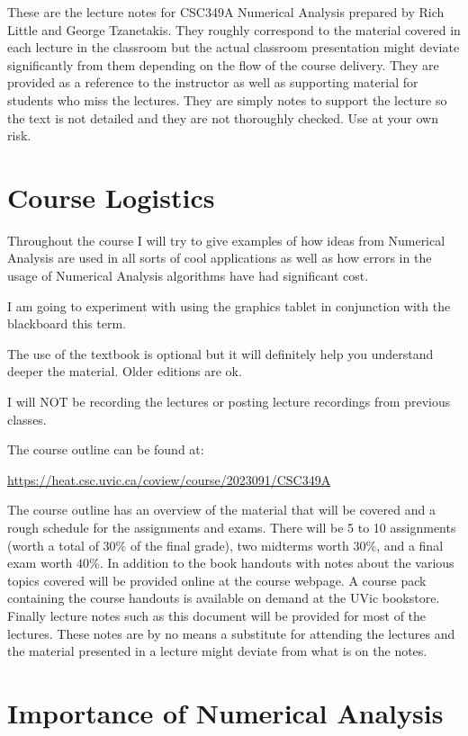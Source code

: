 \documentclass [titlepage,12pt,letter] {article}
\begin{document}
 


These are the lecture notes for CSC349A Numerical Analysis prepared by
Rich Little and George Tzanetakis. They roughly correspond to
the material covered in each lecture in the classroom but the actual
classroom presentation might deviate significantly from them depending
on the flow of the course delivery. They are provided as a reference to
the instructor as well as supporting material for students who miss
the lectures. They are simply notes to support the lecture so the text
is not detailed and they are not thoroughly checked. Use at your own
risk.

\section{Course Logistics} 

Throughout the course I will try to give examples of how
ideas from Numerical Analysis are used in all sorts of cool
applications as well as how errors in the usage of Numerical Analysis
algorithms have had significant cost. 

I am going to experiment with using the graphics tablet in conjunction with the blackboard this term.

The use of the textbook is optional but it will
definitely help you understand deeper the material. Older editions are ok. 

I will NOT be recording the lectures or posting lecture recordings from previous classes.

The course outline can be found at:

\url{https://heat.csc.uvic.ca/coview/course/2023091/CSC349A} 

The course outline has an overview of the material that will be
covered and a rough schedule for the assignments and exams. 
There will be 5 to 10 assignments (worth a total of $30\%$ of the final
grade), two midterms worth $30\%$, and a final exam worth $40\%$. In
addition to the book handouts with notes about the various topics
covered will be provided online at the course webpage. A course pack
containing the course handouts is available on demand at the UVic
bookstore. Finally lecture notes such as this document will be
provided for most of the lectures. These notes are by no means a
substitute for attending the lectures and the material presented in a
lecture might deviate from what is on the notes.





\section{Importance of Numerical Analysis} 
\end{document}

